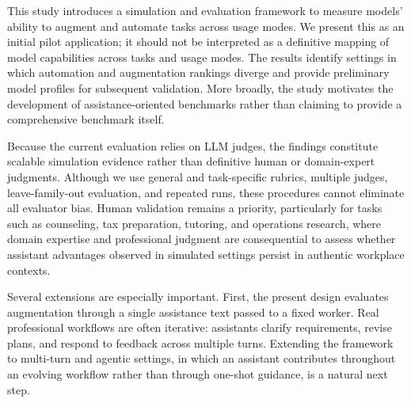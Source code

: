 
This study introduces a simulation and evaluation framework to measure models' ability to augment and automate tasks across usage modes. We present this as an initial pilot application; it should not be interpreted as a definitive mapping
of model capabilities across tasks and usage modes. The results identify
settings in which automation and augmentation rankings diverge and provide
preliminary model profiles for subsequent validation. More broadly, the study
motivates the development of assistance-oriented benchmarks rather than
claiming to provide a comprehensive benchmark itself.

Because the current evaluation relies on LLM judges, the findings constitute
scalable simulation evidence rather than definitive human or domain-expert
judgments. Although we use general and task-specific rubrics, multiple judges,
leave-family-out evaluation, and repeated runs, these procedures cannot eliminate all evaluator bias. Human validation remains a priority, particularly for tasks such as counseling, tax preparation,
tutoring, and operations research, where domain expertise and professional
judgment are consequential to assess whether assistant advantages observed in simulated settings persist in authentic workplace contexts.

Several extensions are especially important. First, the present design evaluates augmentation through a single assistance text passed to a fixed worker. Real professional workflows are often iterative: assistants clarify requirements,
revise plans, and respond to feedback across multiple turns. Extending the
framework to multi-turn and agentic settings, in which an assistant contributes
throughout an evolving workflow rather than through one-shot guidance, is a
natural next step.

